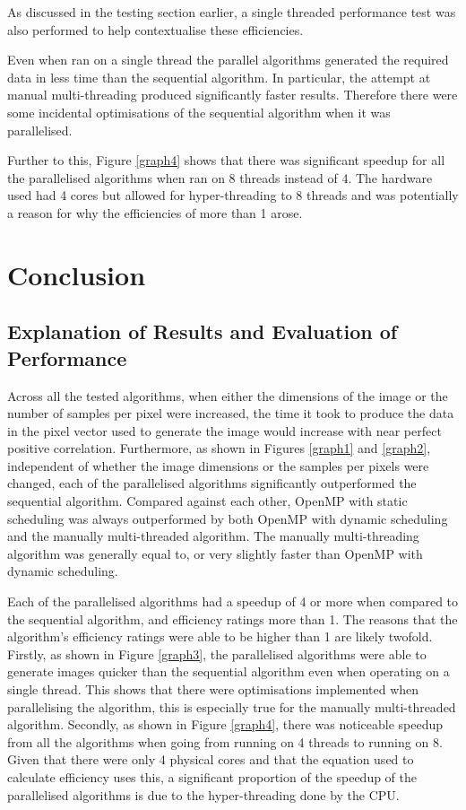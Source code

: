 \documentclass[12pt,journal,transmag]{IEEEtran}
\begin{document}
	As discussed in the testing section earlier, a single threaded performance test was also performed to help contextualise these efficiencies.

	Even when ran on a single thread the parallel algorithms generated the required data in less time than the sequential algorithm. In particular, the attempt at manual multi-threading produced significantly faster results. Therefore there were some incidental optimisations of the sequential algorithm when it was parallelised.

	Further to this, Figure \ref{graph4} shows that there was significant speedup for all the parallelised algorithms when ran on 8 threads instead of 4. The hardware used had 4 cores but allowed for hyper-threading to 8 threads and was potentially a reason for why the efficiencies of more than 1 arose.
	
	\section{Conclusion}
	\subsection{Explanation of Results and Evaluation of Performance}
	Across all the tested algorithms, when either the dimensions of the image or the number of samples per pixel were increased, the time it took to produce the data in the pixel vector used to generate the image would increase with near perfect positive correlation. Furthermore, as shown in Figures \ref{graph1} and \ref{graph2}, independent of whether the image dimensions or the samples per pixels were changed, each of the parallelised algorithms significantly outperformed the sequential algorithm. Compared against each other, OpenMP with static scheduling was always outperformed by both OpenMP with dynamic scheduling	 and the manually multi-threaded algorithm. The manually multi-threading algorithm was generally equal to, or very slightly faster than OpenMP with dynamic scheduling.
	
	Each of the parallelised algorithms had a speedup of 4 or more when compared to the sequential algorithm, and efficiency ratings more than 1. The reasons that the algorithm's efficiency ratings were able to be higher than 1 are likely twofold. Firstly, as shown in Figure \ref{graph3}, the parallelised algorithms were able to generate images quicker than the sequential algorithm even when operating on a single thread. This shows that there were optimisations implemented when parallelising the algorithm, this is especially true for the manually multi-threaded algorithm. Secondly, as shown in Figure \ref{graph4}, there was noticeable speedup from all the algorithms when going from running on 4 threads to running on 8. Given that there were only 4 physical cores and that the equation used to calculate efficiency uses this, a significant proportion of the speedup of the parallelised algorithms is due to the hyper-threading done by the CPU. 
	
\end{document}
